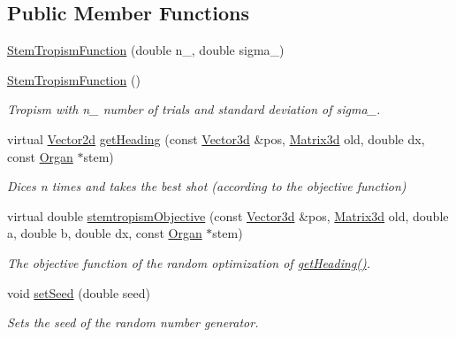 \subsection*{Public Member Functions}
\begin{DoxyCompactItemize}
\item 
\hyperlink{classCPlantBox_1_1StemTropismFunction_a877c9c50285d33a85687a6afccbc0439}{Stem\+Tropism\+Function} (double n\+\_\+, double sigma\+\_\+)
\item 
\hyperlink{classCPlantBox_1_1StemTropismFunction_ae4501c86140ef215dcc0f0e0b3962a6f}{Stem\+Tropism\+Function} ()
\begin{DoxyCompactList}\small\item\em Tropism with n\+\_\+ number of trials and standard deviation of sigma\+\_\+. \end{DoxyCompactList}\item 
virtual \hyperlink{classCPlantBox_1_1Vector2d}{Vector2d} \hyperlink{classCPlantBox_1_1StemTropismFunction_ac72f7ad1200d1defbb3c9b20e20d1f62}{get\+Heading} (const \hyperlink{classCPlantBox_1_1Vector3d}{Vector3d} \&pos, \hyperlink{classCPlantBox_1_1Matrix3d}{Matrix3d} old, double dx, const \hyperlink{classCPlantBox_1_1Organ}{Organ} $\ast$stem)
\begin{DoxyCompactList}\small\item\em Dices n times and takes the best shot (according to the objective function) \end{DoxyCompactList}\item 
virtual double \hyperlink{classCPlantBox_1_1StemTropismFunction_a86dc37330cbec72042352dcce88756ae}{stemtropism\+Objective} (const \hyperlink{classCPlantBox_1_1Vector3d}{Vector3d} \&pos, \hyperlink{classCPlantBox_1_1Matrix3d}{Matrix3d} old, double a, double b, double dx, const \hyperlink{classCPlantBox_1_1Organ}{Organ} $\ast$stem)
\begin{DoxyCompactList}\small\item\em The objective function of the random optimization of \hyperlink{classCPlantBox_1_1StemTropismFunction_ac72f7ad1200d1defbb3c9b20e20d1f62}{get\+Heading()}. \end{DoxyCompactList}\item 
\mbox{\label{classCPlantBox_1_1StemTropismFunction_af7732f6df0e33d5ed992ebe8085e75f1}} 
void \hyperlink{classCPlantBox_1_1StemTropismFunction_af7732f6df0e33d5ed992ebe8085e75f1}{set\+Seed} (double seed)
\begin{DoxyCompactList}\small\item\em Sets the seed of the random number generator. \end{DoxyCompactList}\item 

\end{DoxyCompactItemize}
